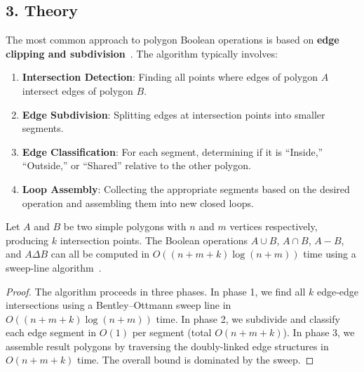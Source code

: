 \subsection{3. Theory}
The most common approach to polygon Boolean operations is based on \textbf{edge clipping and subdivision}~\cite{greiner1998}. The algorithm typically involves:
\begin{enumerate}
    \item \textbf{Intersection Detection}: Finding all points where edges of polygon $A$ intersect edges of polygon $B$.
    \item \textbf{Edge Subdivision}: Splitting edges at intersection points into smaller segments.
    \item \textbf{Edge Classification}: For each segment, determining if it is ``Inside,'' ``Outside,'' or ``Shared'' relative to the other polygon.
    \item \textbf{Loop Assembly}: Collecting the appropriate segments based on the desired operation and assembling them into new closed loops.
\end{enumerate}

\begin{theorem}
\label{thm:pb_complexity}
Let $A$ and $B$ be two simple polygons with $n$ and $m$ vertices respectively, producing $k$ intersection points. The Boolean operations $A \cup B$, $A \cap B$, $A - B$, and $A \Delta B$ can all be computed in $O((n + m + k) \log(n + m))$ time using a sweep-line algorithm~\cite{vatti1992}.
\end{theorem}
\begin{proof}
The algorithm proceeds in three phases. In phase 1, we find all $k$ edge-edge intersections using a Bentley--Ottmann sweep line in $O((n+m+k)\log(n+m))$ time. In phase 2, we subdivide and classify each edge segment in $O(1)$ per segment (total $O(n+m+k)$). In phase 3, we assemble result polygons by traversing the doubly-linked edge structures in $O(n+m+k)$ time. The overall bound is dominated by the sweep.
\end{proof}

